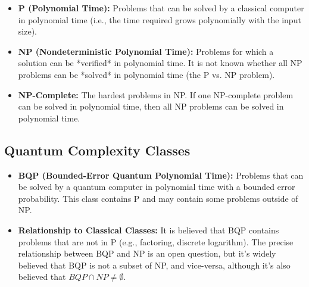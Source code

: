 \documentclass{report}
\begin{document}
\begin{itemize}
    \item \textbf{P (Polynomial Time):} Problems that can be solved by a classical computer in polynomial time (i.e., the time required grows polynomially with the input size).
    \item \textbf{NP (Nondeterministic Polynomial Time):} Problems for which a solution can be *verified* in polynomial time.  It is not known whether all NP problems can be *solved* in polynomial time (the P vs. NP problem).
    \item \textbf{NP-Complete:} The hardest problems in NP. If one NP-complete problem can be solved in polynomial time, then all NP problems can be solved in polynomial time.
\end{itemize}

\subsection{Quantum Complexity Classes}
\label{subsec:quantum-complexity}
\begin{itemize}
    \item \textbf{BQP (Bounded-Error Quantum Polynomial Time):} Problems that can be solved by a quantum computer in polynomial time with a bounded error probability. This class contains P and may contain some problems outside of NP.
    \item \textbf{Relationship to Classical Classes:}  It is believed that BQP contains problems that are not in P (e.g., factoring, discrete logarithm). The precise relationship between BQP and NP is an open question, but it's widely believed that BQP is not a subset of NP, and vice-versa, although it's also believed that \(BQP \cap NP \neq \emptyset \).
\end{itemize}
\end{document}
